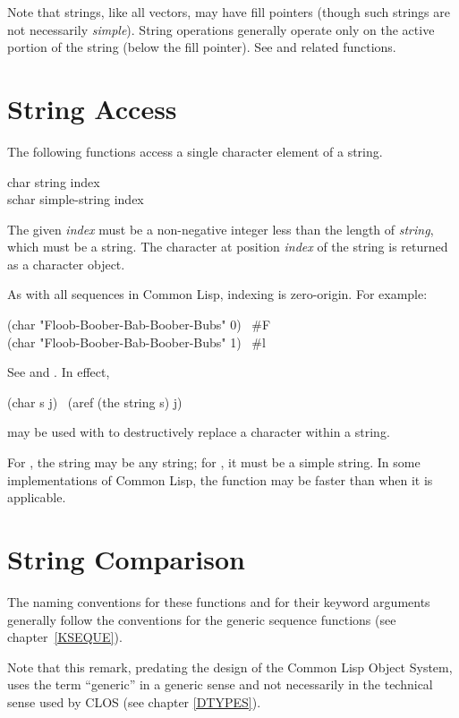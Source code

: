 Note that strings, like all vectors, may have fill pointers
(though such strings are not necessarily \emph{simple}).
String operations generally operate only on the active portion of the string
(below the fill pointer).  See  and related
functions.

\section{String Access}

The following functions access a single character element of a string.

\begin{defun}[Function]
char string index \\
schar simple-string index

The given \emph{index} must be a non-negative integer less than
the length of \emph{string}, which must be a
string.  The character at position \emph{index}
of the string is returned as a character object.

As with all sequences in Common Lisp, indexing is zero-origin.
For example:
\begin{lisp}
(char "Floob-Boober-Bab-Boober-Bubs" 0) \EV\ \#{\Xbackslash}F \\
(char "Floob-Boober-Bab-Boober-Bubs" 1) \EV\ \#{\Xbackslash}l
\end{lisp}
See  and .  In effect,
\begin{lisp}
(char s j) \EQ\ (aref (the string s) j)
\end{lisp}
 may be used with  to destructively replace
a character within a string.

For , the string may be any string;
for , it must be a simple string.
In some implementations of Common Lisp, the function  may
be faster than  when it is applicable.
\end{defun}

\section{String Comparison}

The naming conventions for these functions and for their keyword
arguments generally follow the conventions for the generic sequence
functions (see chapter~\ref{KSEQUE}).

\begin{new}
Note that this remark, predating the design of the Common Lisp Object System,
uses the term ``generic'' in a generic sense and not necessarily
in the technical sense used by CLOS
(see chapter \ref{DTYPES}).
\end{new}

